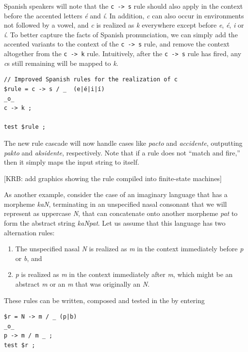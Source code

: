 Spanish speakers will note that the \texttt{c -> s} rule should also apply in the context
before the accented letters
\emph{é} and \emph{í}.  In addition, \emph{c} can also occur in environments not followed by a vowel,
and \emph{c} is realized as \emph{k} everywhere except before \emph{e}, \emph{é}, \emph{i} or \emph{í}.
To better capture the facts of Spanish pronunciation, 
we can simply add the accented variants to the context of the \texttt{c -> s}
rule, and remove the context altogether from the \texttt{c -> k} rule.  Intuitively, after the \texttt{c -> s}
rule has fired, any \emph{c}s still remaining will be mapped to \emph{k}.

\begin{Verbatim}
// Improved Spanish rules for the realization of c
$rule = c -> s / _  (e|é|i|í)
_o_
c -> k ;

test $rule ;
\end{Verbatim}

\noindent
The new rule cascade will now handle cases like \emph{pacto} and \emph{accidente},
outputting \emph{pakto} and \emph{aksidente}, respectively.  Note that if a rule does not ``match and fire,'' then it simply maps the input string to itself.  

[KRB:  add graphics showing the rule compiled into finite-state
machines]

As another example, consider the case of an imaginary language that has a
morpheme \emph{kaN}, terminating in an unspecified nasal consonant that we will
represent as uppercase \emph{N}, that can concatenate onto another morpheme
\emph{pat} to form the abstract string \emph{kaNpat}.  Let us assume that this language
has two alternation rules:

\begin{enumerate}
\item
The unspecified nasal \emph{N} is realized as \emph{m} in the context immediately before \emph{p} or
\emph{b}, and
\item
\emph{p} is realized as \emph{m} in the context immediately after \emph{m}, which might be an abstract
\emph{m} or an \emph{m} that was originally an \emph{N}.
\end{enumerate}

\noindent
These rules can be written, composed and tested in the  by entering


\begin{Verbatim}
$r = N -> m / _ (p|b)
_o_
p -> m / m _ ;
test $r ;
\end{Verbatim}

